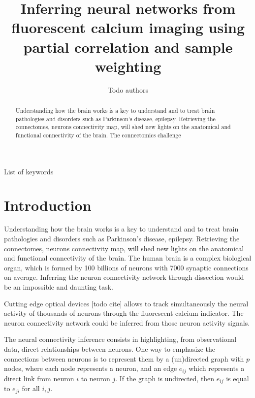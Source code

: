 \documentclass[wcp]{jmlr}
\title[Connectomics challenge]{Inferring neural networks from fluorescent
                               calcium imaging using partial correlation and
                               sample weighting}
\author{Todo authors}
\begin{document}
\maketitle


\begin{abstract}
Understanding how the brain works is a key to understand and to treat
brain pathologies and disorders such as Parkinson's disease, epilepsy.
Retrieving the connectomes, neurons connectivity map, will shed new lights on
the anatomical and functional connectivity of the brain.
The connectomics challenge

\end{abstract}

\begin{keywords}
List of keywords
\end{keywords}


\section{Introduction}\label{sec:intro}

Understanding how the brain works is a key to understand and to treat
brain pathologies and disorders such as Parkinson's disease, epilepsy.
Retrieving the connectomes, neurons connectivity map, will shed new lights on
the anatomical and functional connectivity of the brain.
The human brain is a complex biological organ, which is formed by 100
billions of neurons with 7000 synaptic connections on average. Inferring the
neuron connectivity network through dissection would be an impossible
and daunting task.

Cutting edge optical devices [todo cite] allows to track simultaneously
the neural activity of thousands of neurons through the fluorescent
calcium indicator. The neuron connectivity network could be inferred
from those neuron activity signals.

The neural connectivity inference consists in highlighting, from observational
data, direct relationships between neurons. One way to emphasize the
connections between neurons is to represent them by a (un)directed graph with
$p$ nodes, where each node represents a neuron, and an edge $e_{ij}$ which
represents a direct link from neuron  $i$ to neuron $j$. If the graph is
undirected, then $e_{ij}$ is equal to $e_{ji}$  for all $i,j$.
\end{document}
